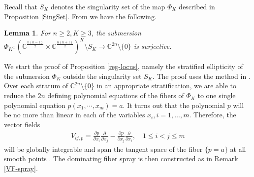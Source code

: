 \documentclass[10pt]{amsart}
\newtheorem{lemm}[theo]{Lemma}
\theoremstyle{remark}
\begin{document}
Recall that $S_K$ denotes the singularity set of the map $\Phi_K$ described in Proposition \ref{SingSet}. From \cite[Theorem 3.5]{Scho} we have the following. 
\begin{lemm}
    For $n \ge 2, K \ge 3$, the submersion $\Phi_K : (\mathbb{C}^{\frac{n(n-1)}{2}} \times \mathbb{C}^{\frac{n(n+1)}{2}})^K \setminus S_K \to \mathbb{C}^{2n}\setminus \{0\}$ is surjective. 
\end{lemm}


We start the proof of Proposition \ref{reg-locus}, namely the stratified ellipticity of the submersion $\Phi_K$ outside the singularity set $S_K$. The proof uses the method in \cite{KI}. Over each stratum of $\mathbb{C}^{2n}\setminus \{0\}$ in an appropriate stratification, we are able to reduce the $2n$ defining polynomial equations of the fibers of $\Phi_K$ to one single polynomial equation $p(x_1, \cdots , x_m) = a$. It turns out that the polynomial $p$ will be no more than linear in each of the variables $x_i, i = 1, \dots, m$. Therefore, the vector fields 
\begin{align*}
    V_{ij,p} = \frac{\partial p}{\partial x_i}\frac{\partial}{\partial x_j} - \frac{\partial p}{\partial x_j}\frac{\partial}{\partial x_i}, \quad  1 \leq i < j \leq m
\end{align*}
will be globally integrable \cite[Lemma 5.2]{KI} and span the tangent space of the fiber $\{ p = a \}$ at all smooth points \cite[Lemma 5.3]{KI}. The dominating fiber spray is then constructed as in Remark \ref{VF-spray}. 
\end{document}
